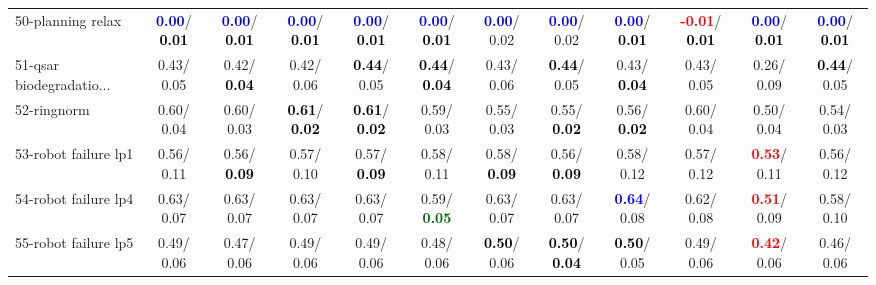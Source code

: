 \begin{table}[h]
\begin{center}
{\begin{tabular}{lc|c|c|c|c|c|c|c|c|c|c}
50-planning relax & \textcolor{blue}{\textbf{  0.00}}/\textcolor{black}{\textbf{  0.01}} & \textcolor{blue}{\textbf{  0.00}}/\textcolor{black}{\textbf{  0.01}} & \textcolor{blue}{\textbf{  0.00}}/\textcolor{black}{\textbf{  0.01}} & \textcolor{blue}{\textbf{  0.00}}/\textcolor{black}{\textbf{  0.01}} & \textcolor{blue}{\textbf{  0.00}}/\textcolor{black}{\textbf{  0.01}} & \textcolor{blue}{\textbf{  0.00}}/  0.02 & \textcolor{blue}{\textbf{  0.00}}/  0.02 & \textcolor{blue}{\textbf{  0.00}}/\textcolor{black}{\textbf{  0.01}} & \textcolor{red}{\textbf{ -0.01}}/\textcolor{black}{\textbf{  0.01}} & \textcolor{blue}{\textbf{  0.00}}/\textcolor{black}{\textbf{  0.01}} & \textcolor{blue}{\textbf{  0.00}}/\textcolor{black}{\textbf{  0.01}} \\
51-qsar biodegradatio... &   0.43/  0.05 &   0.42/\textcolor{black}{\textbf{  0.04}} &   0.42/  0.06 & \textcolor{black}{\textbf{  0.44}}/  0.05 & \textcolor{black}{\textbf{  0.44}}/\textcolor{black}{\textbf{  0.04}} &   0.43/  0.06 & \textcolor{black}{\textbf{  0.44}}/  0.05 &   0.43/\textcolor{black}{\textbf{  0.04}} &   0.43/  0.05 &   0.26/  0.09 & \textcolor{black}{\textbf{  0.44}}/  0.05 \\
52-ringnorm &   0.60/  0.04 &   0.60/  0.03 & \textcolor{black}{\textbf{  0.61}}/\textcolor{black}{\textbf{  0.02}} & \textcolor{black}{\textbf{  0.61}}/\textcolor{black}{\textbf{  0.02}} &   0.59/  0.03 &   0.55/  0.03 &   0.55/\textcolor{black}{\textbf{  0.02}} &   0.56/\textcolor{black}{\textbf{  0.02}} &   0.60/  0.04 &   0.50/  0.04 &   0.54/  0.03 \\
53-robot failure lp1 &   0.56/  0.11 &   0.56/\textcolor{black}{\textbf{  0.09}} &   0.57/  0.10 &   0.57/\textcolor{black}{\textbf{  0.09}} &   0.58/  0.11 &   0.58/\textcolor{black}{\textbf{  0.09}} &   0.56/\textcolor{black}{\textbf{  0.09}} &   0.58/  0.12 &   0.57/  0.12 & \textcolor{red}{\textbf{  0.53}}/  0.11 &   0.56/  0.12 \\ \hline
54-robot failure lp4 &   0.63/  0.07 &   0.63/  0.07 &   0.63/  0.07 &   0.63/  0.07 &   0.59/\textcolor{darkgreen}{\textbf{  0.05}} &   0.63/  0.07 &   0.63/  0.07 & \textcolor{blue}{\textbf{  0.64}}/  0.08 &   0.62/  0.08 & \textcolor{red}{\textbf{  0.51}}/  0.09 &   0.58/  0.10 \\
55-robot failure lp5 &   0.49/  0.06 &   0.47/  0.06 &   0.49/  0.06 &   0.49/  0.06 &   0.48/  0.06 & \textcolor{black}{\textbf{  0.50}}/  0.06 & \textcolor{black}{\textbf{  0.50}}/\textcolor{black}{\textbf{  0.04}} & \textcolor{black}{\textbf{  0.50}}/  0.05 &   0.49/  0.06 & \textcolor{red}{\textbf{  0.42}}/  0.06 &   0.46/  0.06 \\

\end{tabular}}
\end{center}
\end{table}
